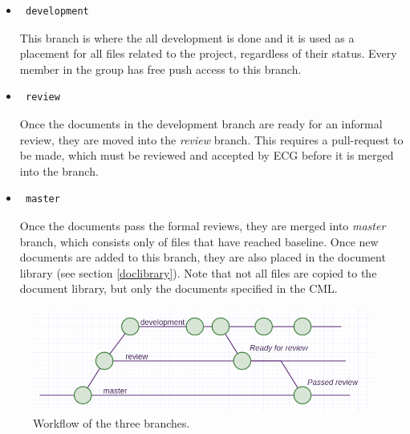 \documentclass{article}
\begin{document}
            \begin{itemize}
                \item \begin{verbatim} development \end{verbatim}
                This branch is where the all development is done and it is used as a placement for all files related
                to the project, regardless of their status.
                Every member in the group has free push access to this branch.
                
                \item \begin{verbatim} review \end{verbatim}
                Once the documents in the development branch are ready for an informal review,  they are moved
                into the \textit{review} branch. This requires a pull-request to be made, which must be reviewed and accepted by ECG before it is merged into the branch. 
                
                \item \begin{verbatim} master \end{verbatim}
                Once the documents pass the formal reviews, they are merged into 
                \textit{master} branch, which consists only of files that have reached baseline.
                Once new documents are added to this branch, they are also placed in the document library (see section \ref{doclibrary}).
                Note that not all files are copied to the document library, but only the documents specified in the CML.
            \end{itemize}
            
            \begin{figure}[h]
                \centering
                \includegraphics[width=\textwidth]{images/workflow.png}
                \caption{Workflow of the three branches.}
                \label{workflow}
            \end{figure}
        
\end{document}
